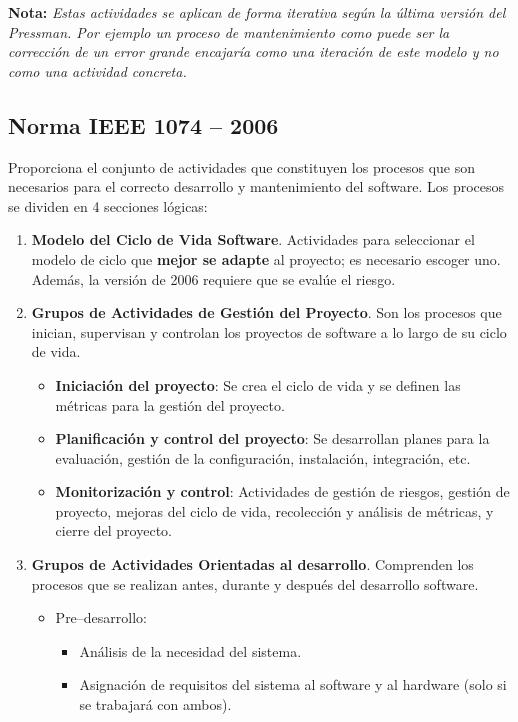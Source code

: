 \textbf{Nota:} \textit{Estas actividades se aplican de forma iterativa según la última versión del Pressman. Por ejemplo un proceso de mantenimiento como puede ser la corrección de un error grande encajaría como una iteración de este modelo y no como una actividad concreta.}

\subsection{Norma IEEE 1074 -- 2006}
Proporciona el conjunto de actividades que constituyen los procesos que son necesarios para el correcto desarrollo y mantenimiento del software. Los procesos se dividen en 4 secciones lógicas:

\begin{enumerate}
    \item \textbf{Modelo del Ciclo de Vida Software}. Actividades para seleccionar el modelo de ciclo que \textbf{mejor se adapte} al proyecto; es necesario escoger uno. Además, la versión de 2006 requiere que se evalúe el riesgo.
    \item \textbf{Grupos de Actividades de Gestión del Proyecto}. Son los procesos que inician, supervisan y controlan los proyectos de software a lo largo de su ciclo de vida.
          \begin{itemize}
              \item \textbf{Iniciación del proyecto}: Se crea el ciclo de vida y se definen las métricas para la gestión del proyecto.
              \item \textbf{Planificación y control del proyecto}: Se desarrollan planes para la evaluación, gestión de la configuración, instalación, integración, etc.
              \item \textbf{Monitorización y control}: Actividades de gestión de riesgos, gestión de proyecto, mejoras del ciclo de vida, recolección y análisis de métricas, y cierre del proyecto.
          \end{itemize}
    \item \textbf{Grupos de Actividades Orientadas al desarrollo}. Comprenden los procesos que se realizan antes, durante y después del desarrollo software.
          \begin{itemize}
              \item Pre--desarrollo:
                    \begin{itemize}
                        \item Análisis de la necesidad del sistema.
                        \item Asignación de requisitos del sistema al software y al hardware (solo si se trabajará con ambos).

\end{itemize}
\end{itemize}
\end{enumerate}
